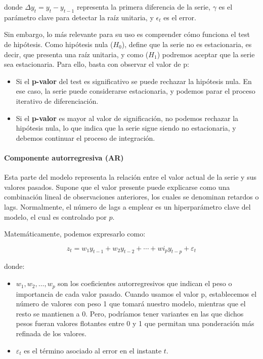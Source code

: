 \begin{itemize}
    donde \( \Delta y_t = y_t - y_{t-1} \) representa la primera diferencia de la serie, \( \gamma \) es el parámetro clave para detectar la raíz unitaria, y \( \epsilon_t \) es el error.

    Sin embargo, lo más relevante para su uso es comprender cómo funciona el test de hipótesis. Como hipótesis nula (\( H_0 \)), define que la serie no es estacionaria, es decir, que presenta una raíz unitaria, y como (\( H_1 \)) podremos aceptar que la serie sea estacionaria. Para ello, basta con observar el valor de p:

    \begin{itemize}
        \item Si el \textbf{p-valor} del test es significativo se puede rechazar la hipótesis nula. En ese caso, la serie puede considerarse estacionaria, y podemos parar el proceso iterativo de diferenciación.
        \item Si el \textbf{p-valor} es mayor al valor de significación, no podemos rechazar la hipótesis nula, lo que indica que la serie sigue siendo no estacionaria, y debemos continuar el proceso de integración.
    \end{itemize}

\end{itemize}

\paragraph{Componente autorregresiva (AR)}


Esta parte del modelo representa la relación entre el valor actual de la serie y sus valores pasados. Supone que el valor presente puede explicarse como una combinación lineal de observaciones anteriores, los cuales se denominan retardos o lags. Normalmente, el número de lags a emplear es un hiperparámetro clave del modelo, el cual es controlado por  \( p \).

Matemáticamente, podemos expresarlo como:

\[
    z_t = w_1 y_{t-1} + w_2 y_{t-2} + \cdots + wi_p y_{t-p} + \varepsilon_t
\]

donde:
\begin{itemize}
    \item \( w_1, w_2, \ldots, w_p \) son los coeficientes autorregresivos que indican el peso o importancia de cada valor pasado. Cuando usamos el valor p, establecemos el número de valores con peso 1 que tomará nuestro modelo, mientras que el resto se mantienen a 0. Pero, podríamos tener variantes en las que dichos pesos fueran valores flotantes entre 0 y 1 que permitan una ponderación más refinada de los valores.
    \item \( \varepsilon_t \) es el término asociado al error en el instante \( t \).
\end{itemize}

